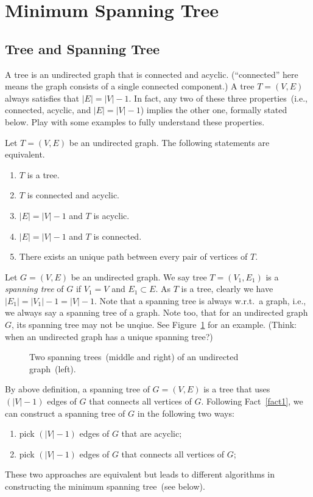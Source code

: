 \section{Minimum Spanning Tree}

\subsection*{Tree and Spanning Tree}

A tree is an undirected graph that is connected and acyclic.
(``connected'' here means the graph consists of a single connected component.)
A tree $T = (V, E)$ always satisfies that $|E| = |V| - 1$.
In fact, any two of these three properties~(i.e., connected, acyclic, and $|E| = |V| - 1$)
implies the other one, formally stated below. Play with some examples
to fully understand these properties.

\begin{fact}\label{fact1}
Let $T = (V, E)$ be an undirected graph. The following statements are equivalent.
\vspace*{-\topsep}
\begin{enumerate}
\item $T$ is a tree.
\item $T$ is connected and acyclic.
\item $|E| = |V| - 1$ and $T$ is acyclic.
\item $|E| = |V| - 1$ and $T$ is connected.
\item There exists an unique path between every pair of vertices of $T$.
\end{enumerate}
\end{fact}

Let $G = (V,E)$ be an undirected graph.
We say tree $T = (V_1, E_1)$ is a \emph{spanning tree}
of $G$ if $V_1 = V$ and $E_1\subset E$.
As $T$ is a tree, clearly we have $|E_1| = |V_1| - 1 = |V| - 1$.
Note that a spanning tree is always w.r.t.\ a graph, i.e., we always
say a spanning tree of a graph. Note too, that for an undirected graph $G$, 
its spanning tree may not be unqiue. See Figure~\ref{fig:spanning}
for an example.  (Think: when an undirected graph has a unique spanning tree?)

\begin{figure}[h]
\centering{}
\caption{Two spanning trees~(middle and right) of an undirected graph~(left).}
\label{fig:spanning}
\end{figure}

By above definition, a spanning tree of $G = (V,E)$ is a tree that uses $(|V| - 1)$ edges
of $G$ that connects all vertices of $G$.
Following Fact~\ref{fact1}, we can construct a spanning tree of $G$
in the following two ways:
\vspace*{-\topsep}
\begin{enumerate}
\item pick $(|V|-1)$ edges of $G$ that are acyclic;
\item pick $(|V|-1)$ edges of $G$ that connects all vertices of $G$;
\end{enumerate}
These two approaches are equivalent but leads to different algorithms
in constructing the minimum spanning tree~(see below).


